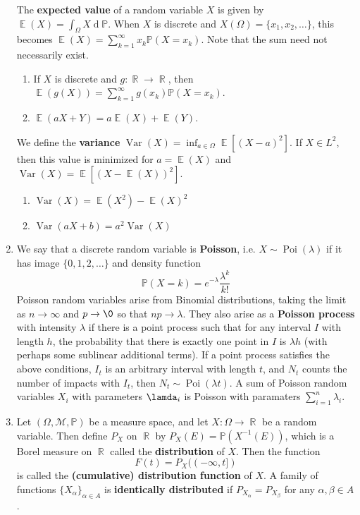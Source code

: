 \documentclass[12pt, a4paper]{article}
\DeclareMathOperator{\R}{\mathbb{R}}
\DeclareMathOperator{\E}{\mathbb{E}}
\DeclareMathOperator{\Var}{Var}
\renewcommand{\Pr}{\mathbb{P}}
\renewcommand{\d}[1]{\ensuremath{\operatorname{d}\!{#1}}} %
\theoremstyle{nonumberplain}
\begin{document}
\begin{enumerate}
        The \textbf{expected value} of a random variable $X$ is given by $\E(X)=\int_\Omega X\d{\Pr}$.
        When $X$ is discrete and $X(\Omega)=\{x_1,x_2,\ldots\}$, this becomes $\E(X)=\sum\limits_{k=1}^\infty x_k\Pr(X=x_k)$.
        Note that the sum need not necessarily exist.
        \begin{enumerate}
            \item If $X$ is discrete and $g:\R\to\R$, then $\E(g(X))=\sum\limits_{k=1}^\infty g(x_k)\Pr(X=x_k)$.
            \item $\E(aX+Y)=a\E(X)+\E(Y)$.
        \end{enumerate}
        We define the \textbf{variance} $\Var(X)=\inf_{a\in\Omega}\E[(X-a)^2]$.
        If $X\in L^2$, then this value is minimized for $a=\E(X)$ and $\Var(X)=\E[(X-\E(X))^2]$.
        \begin{enumerate}
            \item $\Var(X)=\E(X^2)-\E(X)^2$
            \item $\Var(aX+b)=a^2\Var(X)$
        \end{enumerate}
    \item We say that a discrete random variable is \textbf{Poisson}, i.e. $X\sim\operatorname{Poi}(\lambda)$ if it has image $\{0,1,2,\ldots\}$ and density function
        \[\Pr(X=k)=e^{-\lambda}\frac{\lambda^k}{k!}\]
        Poisson random variables arise from Binomial distributions, taking the limit as $n\to\infty$ and $p\to\0$ so that $np\to\lambda$.
        They also arise as a \textbf{Poisson process} with intensity $\lambda$ if there is a point process such that for any interval $I$ with length $h$, the probability that there is exactly one point in $I$ is $\lambda h$ (with perhaps some sublinear additional terms).
        If a point process satisfies the above conditions, $I_t$ is an arbitrary interval with length $t$, and $N_t$ counts the number of impacts with $I_t$, then $N_t\sim\operatorname{Poi}(\lambda t)$.
        A sum of Poisson random variables $X_i$ with parameters $\lamda_i$ is Poisson with paramaters $\sum_{i=1}^n\lambda_i$.
    \item Let $(\Omega,\mathcal{M},\Pr)$ be a measure space, and let $X:\Omega\to\R$ be a random variable.
        Then define $P_X$ on $\R$ by $P_X(E)=\Pr(X^{-1}(E))$, which is a Borel measure on $\R$ called the \textbf{distribution} of $X$.
        Then the function
        \[F(t)=P_X((-\infty,t])\] %
        is called the \textbf{(cumulative) distribution function} of $X$.
        A family of functions $\{X_\alpha\}_{\alpha\in A}$ is \textbf{identically distributed} if $P_{X_\alpha}=P_{X_\beta}$ for any $\alpha,\beta\in A$.

\end{enumerate}
\end{document}
